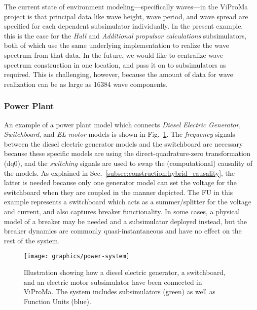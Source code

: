 \documentclass[prb,aps,showpacs,floatfix,twocolumn,10pt]{revtex4-1}
\newcommand{\sub}{subsimulator}
\newlength{\graphicswidth}
\theoremstyle{plain}
\theoremstyle{remark}
\begin{document}
The current state of environment modeling---specifically waves---in the ViProMa project is that principal data like wave height, wave period, and wave spread are specified for each dependent \sub{} individually.
In the present example, this is the case for the \emph{Hull} and \emph{Additional propulsor calculations} \sub{}s, both of which use the same underlying implementation to realize the wave spectrum from that data.
In the future, we would like to centralize wave spectrum construction in one location, and pass it on to \sub{}s as required.
This is challenging, however, because the amount of data for wave realization can be as large as \num{16384} wave components.

\subsubsection{Power Plant}
\label{subsec:construction:model_examples:power_plant}

An example of a power plant model which connects \emph{Diesel Electric Generator}, \emph{Switchboard}, and \emph{EL-motor} models is shown in Fig.~\ref{fig:power-system}.
The \emph{frequency} signals between the diesel electric generator models and the switchboard are necessary because these specific models are using the direct-quadrature-zero transformation (dq0), and the \emph{switching} signals are used to swap the (computational) causality of the models.
As explained in Sec.~\ref{subsec:construction:hybrid_causality}, the latter is needed because only one generator model can set the voltage for the switchboard when they are coupled in the manner depicted.
The FU in this example represents a switchboard which acts as a summer/splitter for the voltage and current, and also captures breaker functionality.
In some cases, a physical model of a breaker may be needed and a \sub{} deployed instead, but the breaker dynamics are commonly quasi-instantaneous and have no effect on the rest of the system.

\begin{figure}[h!tb]
  \texttt{[image: graphics/power-system]}
  \caption{%
  	Illustration showing how a diesel electric generator, a switchboard, and an electric motor \sub{} have been connected in ViProMa.
  	The system includes \sub{}s (green) as well as Function Units (blue).
  }
  \label{fig:power-system}
\end{figure}


\end{document}
